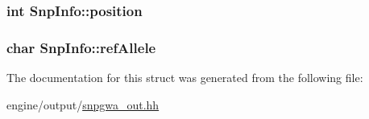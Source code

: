 \label{structSnpInfo_ad7d911ac92fd6e76e7140dc02f8646b7}
\hypertarget{structSnpInfo_a591c2bc650f6108b2e6ce0088ca1c8ca}{
\subsubsection[{position}]{\setlength{\rightskip}{0pt plus 5cm}int {\bf SnpInfo::position}}}
\label{structSnpInfo_a591c2bc650f6108b2e6ce0088ca1c8ca}
\hypertarget{structSnpInfo_a7bb6397cd3bbc9461b0b2bf5390bf2b1}{
\subsubsection[{refAllele}]{\setlength{\rightskip}{0pt plus 5cm}char {\bf SnpInfo::refAllele}}}
\label{structSnpInfo_a7bb6397cd3bbc9461b0b2bf5390bf2b1}


The documentation for this struct was generated from the following file:\begin{DoxyCompactItemize}
\item 
engine/output/\hyperlink{snpgwa__out_8hh}{snpgwa\_\-out.hh}\end{DoxyCompactItemize}
